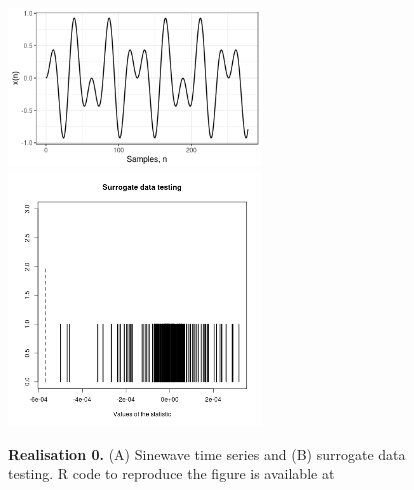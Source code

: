 \documentclass[11pt]{article}
\newcommand{\R}{\textsf{R}\xspace}
\newcommand{\codeicon}{{\color{linkcolor}\faFileCodeO}}
\newcommand{\codelink}[1]{\href{#1}{\codeicon}}
\begin{document}
\begin{figure}
\centering
\includegraphics[width=0.6\textwidth]{r0_ts_sinewaves_window_length_278} %
\includegraphics[width=0.6\textwidth]{r0_sdt_sinewaves_window_length_278} %
    \caption[]{
	{\bf Realisation 0.}
	(A) Sinewave time series and (B) surrogate data testing.
	\R code to reproduce the figure is available at 
	\codelink{https://github.com/mxochicale-phd/thesis/blob/master/0_code_data/1_code/x_surrogate/00_timeseries/code/B_.R}
	}
    \label{fig:thesis-outline}
\end{figure}
\end{document}
